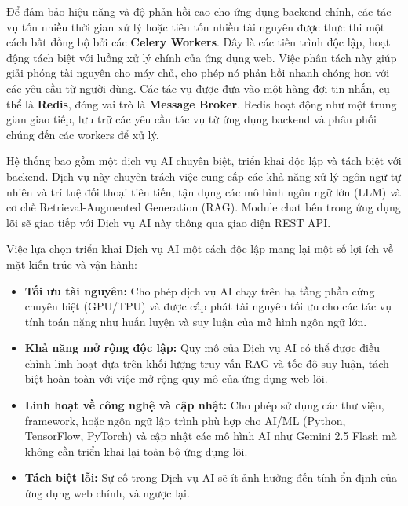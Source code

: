 
Để đảm bảo hiệu năng và độ phản hồi cao cho ứng dụng backend chính, các tác vụ tốn nhiều thời gian xử lý hoặc tiêu tốn nhiều tài nguyên được thực thi một cách bất đồng bộ bởi các \textbf{Celery Workers}. Đây là các tiến trình độc lập, hoạt động tách biệt với luồng xử lý chính của ứng dụng web. Việc phân tách này giúp giải phóng tài nguyên cho máy chủ, cho phép nó phản hồi nhanh chóng hơn với các yêu cầu từ người dùng. Các tác vụ được đưa vào một hàng đợi tin nhắn, cụ thể là \textbf{Redis}, đóng vai trò là \textbf{Message Broker}. Redis hoạt động như một trung gian giao tiếp, lưu trữ các yêu cầu tác vụ từ ứng dụng backend và phân phối chúng đến các workers để xử lý.


Hệ thống bao gồm một dịch vụ AI chuyên biệt, triển khai độc lập và tách biệt với backend. Dịch vụ này chuyên trách việc cung cấp các khả năng xử lý ngôn ngữ tự nhiên và trí tuệ đối thoại tiên tiến, tận dụng các mô hình ngôn ngữ lớn (LLM) và cơ chế Retrieval-Augmented Generation (RAG). Module chat bên trong ứng dụng lõi sẽ giao tiếp với Dịch vụ AI này thông qua giao diện REST API.

Việc lựa chọn triển khai Dịch vụ AI một cách độc lập mang lại một số lợi ích về mặt kiến trúc và vận hành:
\begin{itemize}
	\item \textbf{Tối ưu tài nguyên:} Cho phép dịch vụ AI chạy trên hạ tầng phần cứng chuyên biệt (GPU/TPU) và được cấp phát tài nguyên tối ưu cho các tác vụ tính toán nặng như huấn luyện và suy luận của mô hình ngôn ngữ lớn.
	\item \textbf{Khả năng mở rộng độc lập:} Quy mô của Dịch vụ AI có thể được điều chỉnh linh hoạt dựa trên khối lượng truy vấn RAG và tốc độ suy luận, tách biệt hoàn toàn với việc mở rộng quy mô của ứng dụng web lõi.
	\item \textbf{Linh hoạt về công nghệ và cập nhật:} Cho phép sử dụng các thư viện, framework, hoặc ngôn ngữ lập trình phù hợp cho AI/ML (Python, TensorFlow, PyTorch) và cập nhật các mô hình AI như Gemini 2.5 Flash mà không cần triển khai lại toàn bộ ứng dụng lõi.
	\item \textbf{Tách biệt lỗi:} Sự cố trong Dịch vụ AI sẽ ít ảnh hưởng đến tính ổn định của ứng dụng web chính, và ngược lại.
\end{itemize}

